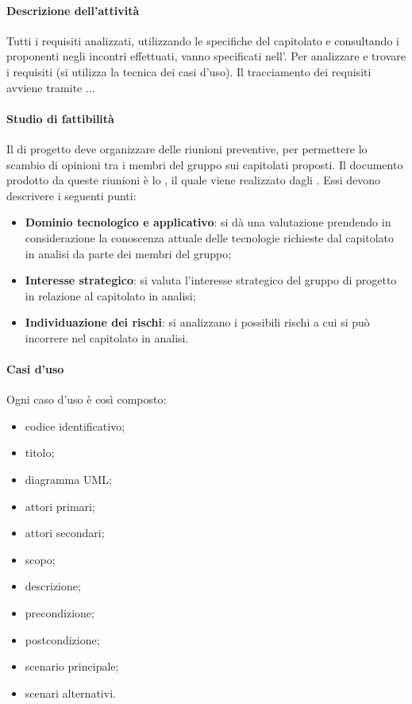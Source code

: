  \paragraph{Descrizione dell'attività}
 Tutti i requisiti analizzati, utilizzando le specifiche del capitolato e consultando i proponenti negli
incontri effettuati, vanno specificati nell'\ARdocRR. Per analizzare e trovare i
requisiti (si utilizza la tecnica dei casi d'uso). Il tracciamento dei requisiti avviene tramite ... 
 \paragraph{Studio di fattibilità}
 Il \RESP{} di progetto deve organizzare delle riunioni preventive, per permettere lo scambio
di opinioni tra i membri del gruppo sui capitolati proposti. Il documento prodotto da queste
riunioni è lo \SFdocRR , il quale viene realizzato dagli \ANP{}. Essi devono
descrivere i seguenti punti: 
\begin{itemize}
 \item \textbf{Dominio tecnologico e applicativo}: si dà una valutazione prendendo in   considerazione
 la conoscenza attuale delle tecnologie richieste dal capitolato in analisi da parte dei membri  
del gruppo;
 \item \textbf{Interesse strategico}: si valuta l'interesse strategico del gruppo di progetto in relazione
al capitolato in analisi;
 \item \textbf{Individuazione dei rischi}: si analizzano i possibili rischi a cui si può incorrere nel
capitolato in analisi.
\end{itemize}
 \paragraph{Casi d'uso}
 Ogni caso d'uso è così composto:
 \begin{itemize}
  \item codice identificativo;
  \item titolo;
  \item diagramma UML;
  \item attori primari;
  \item attori secondari;
  \item scopo;
  \item descrizione;
  \item precondizione;
  \item postcondizione;
  \item scenario principale;
  \item scenari alternativi.
 \end{itemize}

